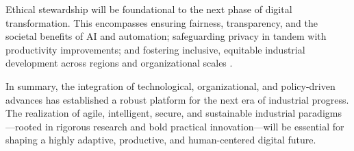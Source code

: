 \documentclass[sigconf]{acmart}
\begin{document}
Ethical stewardship will be foundational to the next phase of digital transformation. This encompasses ensuring fairness, transparency, and the societal benefits of AI and automation; safeguarding privacy in tandem with productivity improvements; and fostering inclusive, equitable industrial development across regions and organizational scales \cite{ref35}\cite{ref41}\cite{ref90}.

In summary, the integration of technological, organizational, and policy-driven advances has established a robust platform for the next era of industrial progress. The realization of agile, intelligent, secure, and sustainable industrial paradigms—rooted in rigorous research and bold practical innovation—will be essential for shaping a highly adaptive, productive, and human-centered digital future.



\end{document}
